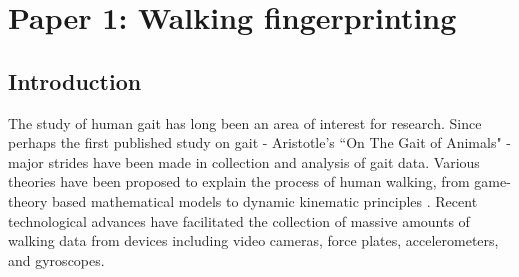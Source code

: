 \chapter{Paper 1: Walking fingerprinting}
\label{chap:paper1}

\begin{abstract}

We consider the problem of predicting an individual's identity from accelerometry data collected during walking. In a previous paper we introduced an approach that transforms the accelerometry time series into an image by constructing the joint distribution of the acceleration and lagged acceleration for a vector of lags. Predictors derived by partitioning this image into grid cells were used in logistic regression to predict individuals. Here we: (1) implement machine learning methods for prediction using the grid cell-derived predictors; (2) derive inferential methods to screen for the most predictive grid cells while adjusting for correlation and multiple comparisons; and (3) develop a novel multivariate functional regression model that avoids partitioning the predictor space. Prediction methods are compared on two open source data sets: (1) accelerometry data collected from $32$ individuals walking on a $1.06$ kilometer path; and (2) accelerometry data collected from six repetitions of walking on a $20$ meter path on two separate occasions at least one week apart for $153$ study participants. In the $32$-individual study, all methods achieve at least $95$\% rank-1 accuracy, while in the $153$-individual study, accuracy varies from $41$\% to $98$\%, depending on the method and prediction task. Methods provide insights into why some individuals are easier to predict than others. 

\end{abstract}

\section{Introduction}
\label{sec:intro}


The study of human gait has long been an area of interest for research. Since perhaps the first published study on gait - Aristotle's ``On The Gait of Animals" \cite{connor_biometric_2018} - major strides have been made in collection and analysis of gait data. Various theories have been proposed to explain the  process of human walking, from game-theory based mathematical models \cite{iosa_golden_2017} to dynamic kinematic principles \cite{kuo_dynamic_2010}. Recent technological advances have facilitated the collection of massive amounts of walking data from devices including video cameras, force plates, accelerometers, and gyroscopes. 

